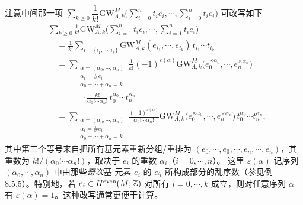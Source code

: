 注意中间那一项 $\sum\limits_{k\ge0}\dfrac{1}{k!}\mathrm{GW}^M_{A,k}
\big(\sum\limits_{i=0}^nt_ie_i,\cdots,\sum\limits_{i=0}^nt_ie_i\big)$ 可改写如下
\begin{align*}
  &\sum_{k\ge0}\frac{1}{k!}\mathrm{GW}^M_{A,k}
  \Big(\sum_{i=1}^nt_ie_i,\cdots,\sum_{i=1}^nt_ie_i\Big)\\
  &\quad=\frac{1}{k!}\sum_{i=\{i_1,\cdots,i_k\}}
    \mathrm{GW}^M_{A,k}(e_{i_1},\cdots,e_{i_k})\,t_{i_1}\cdots t_{i_k}\\
  &\quad=\sum_{\substack{\alpha=(\alpha_0,\cdots,\alpha_n)\\
    \alpha_i=\# e_i\\ \alpha_0+\cdots+\alpha_n=k}}
    \frac{1}{k!}(-1)^{\varepsilon(\alpha)}\mathrm{GW}^M_{A,k}
    \big(e_0^{\times\alpha_0},\cdots,e_n^{\times\alpha_n}\big)\\
  &\qquad\qquad\cdot\frac{k!}{\alpha_0!\cdots\alpha_n!}
    \,t_0^{\alpha_0}\cdots t_n^{\alpha_n}\\
  &\quad=\sum_{\substack{\alpha=(\alpha_0,\cdots,\alpha_n)\\
    \alpha_i=\# e_i\\ \alpha_0+\cdots+\alpha_n=k}}
    \frac{(-1)^{\varepsilon(\alpha)}}{\alpha_0!\cdots\alpha_n!}\mathrm{GW}^M_{A,k}
    \big(e_0^{\times\alpha_0},\cdots,e_n^{\times\alpha_n}\big)\,
    t_0^{\alpha_0}\cdots t_n^{\alpha_n},
\end{align*}
其中第三个等号来自把所有基元素重新分组/重排为
$(e_0,\cdots,e_0,\cdots,e_n,\cdots,e_n)$，其重数为
$k!/(\alpha_0!\cdots\alpha_n!)$，取决于 $e_i$ 的重数 $\alpha_i$（$i=0,\cdots,n$）。
这里 $\varepsilon(\alpha)$ 记序列 $(\alpha_0,\cdots,\alpha_n)$ 中由那些\emph{奇次}基
元素 $e_i$ 的 $\alpha_i$ 所构成部分的乱序数（参见例 8.5.5）。特别地，若
$e_i\in H^{\mathrm{even}}(M;\mathbb{Z})$ 对所有 $i=0,\cdots,k$ 成立，则对任意序列 $\alpha$ 有
$\varepsilon(\alpha)=1$。这种改写通常更便于计算。

